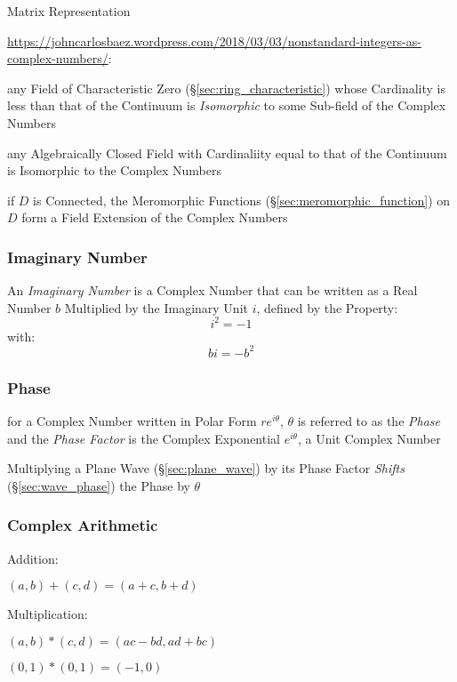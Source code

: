 Matrix Representation %

\url{https://johncarlosbaez.wordpress.com/2018/03/03/nonstandard-integers-as-complex-numbers/}:

any Field of Characteristic Zero (\S\ref{sec:ring_characteristic}) whose
Cardinality is less than that of the Continuum is \emph{Isomorphic} to some
Sub-field of the Complex Numbers

any Algebraically Closed Field with Cardinaliity equal to that of the Continuum
is Isomorphic to the Complex Numbers

if $D$ is Connected, the Meromorphic Functions
(\S\ref{sec:meromorphic_function}) on $D$ form a Field Extension of the Complex
Numbers



\subsubsection{Imaginary Number}\label{sec:imaginary_number}

An \emph{Imaginary Number} is a Complex Number that can be written as a Real
Number $b$ Multiplied by the Imaginary Unit $i$, defined by the Property:
\[
  i^2 = -1
\]
with:
\[
  bi = -b^2
\]



\subsubsection{Phase}\label{sec:phase}

for a Complex Number written in Polar Form $re^{i\theta}$, $\theta$ is referred
to as the \emph{Phase} and the \emph{Phase Factor} is the Complex Exponential
$e^{i\theta}$, a Unit Complex Number

Multiplying a Plane Wave (\S\ref{sec:plane_wave}) by its Phase Factor
\emph{Shifts} (\S\ref{sec:wave_phase}) the Phase by $\theta$



\subsubsection{Complex Arithmetic}\label{sec:complex_arithmetic}

Addition:

$(a,b) + (c,d) = (a + c, b + d)$

Multiplication:

$(a,b)*(c,d) = (ac - bd, ad + bc)$

$(0,1)*(0,1) = (-1, 0)$


